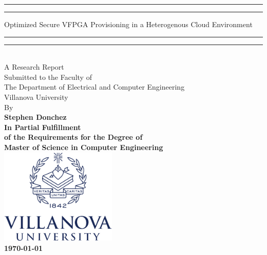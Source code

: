 \begin{titlepage}
    \begingroup

\centering

\sffamily\bfseries\fontsize{24.88}{31.2}\selectfont
\rule{\textwidth}{1.6pt}\vspace*{-\baselineskip}\vspace*{2pt} %
	\rule{\textwidth}{0.4pt} %
	
	\vspace{0.5\baselineskip} %
	Optimized Secure VFPGA Provisioning in a Heterogenous Cloud Environment

\rule{\textwidth}{1.6pt}\vspace*{-\baselineskip}\vspace*{2pt} %
	\rule{\textwidth}{0.4pt} %
\\[0.4in]
\normalfont\large
A Research Report\\
Submitted to the Faculty of\\
The Department of Electrical and Computer Engineering\\
 Villanova University\\
 \vspace{.2in}
 By
\\
\vspace{0.25in}
\sffamily\bfseries\Large
Stephen Donchez
\\[0.4in]
\normalfont\normalsize
In Partial Fulfillment\\ of the Requirements for the Degree of\\

Master of Science in Computer Engineering
\\[1.5em]
\includegraphics[height=1.8in]{vulogo}\\
[4em]
\today
\par
\endgroup

\end{titlepage}